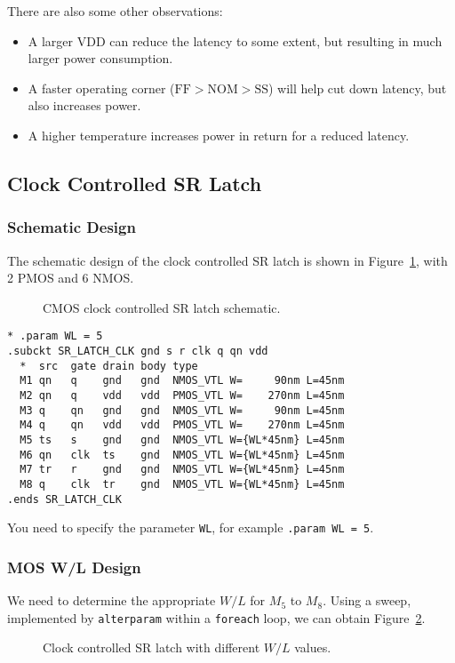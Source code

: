\documentclass{scrartcl}
\newcommand{\includeres}[1]{\sffamily\scriptsize\vspace{-2em}}
\begin{document}
        There are also some other observations:
        \begin{itemize}
          \item A larger VDD can reduce the latency to some extent, but resulting in much larger power consumption.
          \item A faster operating corner ($\text{FF} > \text{NOM} > \text{SS}$) will help cut down latency, but also increases power.
          \item A higher temperature increases power in return for a reduced latency.
        \end{itemize}

      \subsection{Clock Controlled SR Latch}

        \subsubsection{Schematic Design}

          The schematic design of the clock controlled SR latch is shown in Figure~\ref{fig:sr_latch},
          with 2 PMOS and 6 NMOS.
          \begin{figure}[htbp]
            \centering
            
            \caption{CMOS clock controlled SR latch schematic.}
            \label{fig:sr_latch}
          \end{figure}

          \begin{lstlisting}[title={Clock Controlled SR Latch Subcircuit}]
* .param WL = 5
.subckt SR_LATCH_CLK gnd s r clk q qn vdd
  *  src  gate drain body type
  M1 qn   q    gnd   gnd  NMOS_VTL W=     90nm L=45nm
  M2 qn   q    vdd   vdd  PMOS_VTL W=    270nm L=45nm
  M3 q    qn   gnd   gnd  NMOS_VTL W=     90nm L=45nm
  M4 q    qn   vdd   vdd  PMOS_VTL W=    270nm L=45nm
  M5 ts   s    gnd   gnd  NMOS_VTL W={WL*45nm} L=45nm
  M6 qn   clk  ts    gnd  NMOS_VTL W={WL*45nm} L=45nm
  M7 tr   r    gnd   gnd  NMOS_VTL W={WL*45nm} L=45nm
  M8 q    clk  tr    gnd  NMOS_VTL W={WL*45nm} L=45nm
.ends SR_LATCH_CLK
          \end{lstlisting}

          You need to specify the parameter \texttt{WL},
          for example \texttt{.param WL = 5}.

        \newpage
        \subsubsection{MOS W/L Design}
          We need to determine the appropriate $W/L$ for $M_5$ to $M_8$.
          Using a sweep, implemented by \texttt{alterparam} within a \texttt{foreach} loop,
          we can obtain Figure~\ref{fig:sr_latch_wl}.
          \begin{figure}[htbp]
            \includeres{sr_latch_wl}
            \caption{Clock controlled SR latch with different $W/L$ values.}
            \label{fig:sr_latch_wl}
          \end{figure}
\end{document}
